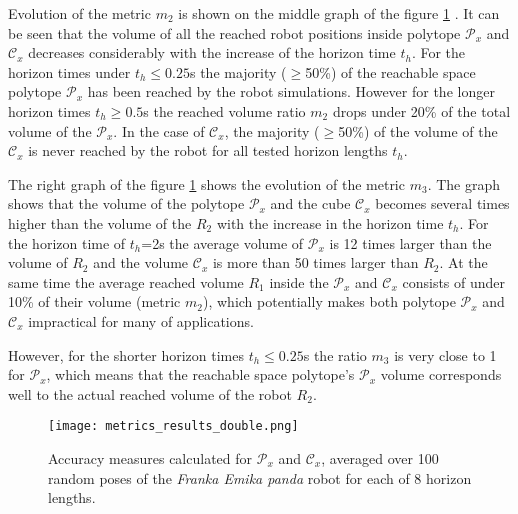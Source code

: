 Evolution of the metric $m_2$ is shown on the middle graph of the figure \ref{fig:accuracy} . It can be seen that the volume of all the reached robot positions inside polytope $\mathcal{P}_x$ and $\mathcal{C}_x$ decreases considerably with the increase of the horizon time $t_h$. For the horizon times under $t_h\leq 0.25$s the majority ($\geq$50\%) of the reachable space polytope $\mathcal{P}_x$ has been reached by the robot simulations. However for the longer horizon times $t_h\geq0.5$s the reached volume ratio $m_2$ drops under 20\% of the total volume of the $\mathcal{P}_x$. In the case of $\mathcal{C}_x$, the majority ($\geq$50\%)  of the volume of the $\mathcal{C}_x$ is never reached by the robot for all tested horizon lengths $t_h$. 


The right graph of the figure \ref{fig:accuracy} shows the evolution of the metric $m_3$. The graph shows that the volume of the polytope $\mathcal{P}_x$ and the cube $\mathcal{C}_x$ becomes several times higher than the volume of the $R_2$ with the increase in the horizon time $t_h$. For the horizon time of $t_h$=2s the average volume of $\mathcal{P}_x$ is 12 times larger than the volume of $R_2$ and the volume $\mathcal{C}_x$ is more than 50 times larger than $R_2$. At the same time the average reached volume $R_1$ inside the $\mathcal{P}_x$ and $\mathcal{C}_x$ consists of under 10\% of their volume (metric $m_2$), which potentially makes both polytope $\mathcal{P}_x$ and $\mathcal{C}_x$ impractical for many of applications. 

However, for the shorter horizon times $t_h\leq0.25$s the ratio $m_3$ is very close to 1 for $\mathcal{P}_x$, which means that the reachable space polytope's $\mathcal{P}_x$ volume corresponds well to the actual reached volume of the robot $R_2$.


\begin{figure}[!t]
    \centering
    \texttt{[image: metrics\_results\_double.png]}
    \caption{Accuracy measures calculated for $\mathcal{P}_x$ and $\mathcal{C}_x$, averaged over 100 random poses of the \textit{Franka Emika panda} robot for each of 8 horizon lengths.}
    \label{fig:accuracy}
    \vspace{-0.5cm}
\end{figure}


